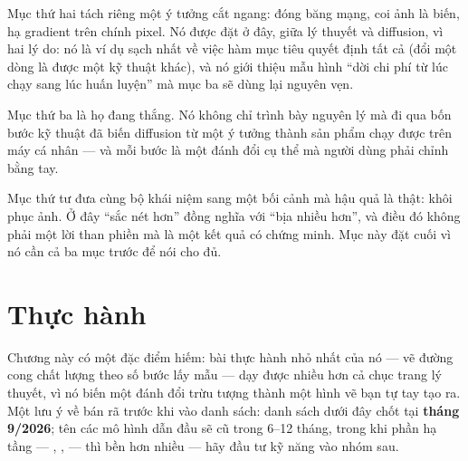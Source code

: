 \documentclass[../../deep_learning.tex]{subfiles}
\begin{document}
Mục thứ hai tách riêng một ý tưởng cắt ngang: đóng băng mạng, coi ảnh là biến, hạ gradient trên chính pixel. Nó được đặt ở đây, giữa lý thuyết và diffusion, vì hai lý do: nó là ví dụ sạch nhất về việc hàm mục tiêu quyết định tất cả (đổi một dòng là được một kỹ thuật khác), và nó giới thiệu mẫu hình ``dời chi phí từ lúc chạy sang lúc huấn luyện'' mà mục ba sẽ dùng lại nguyên vẹn.

Mục thứ ba là họ đang thắng. Nó không chỉ trình bày nguyên lý mà đi qua bốn bước kỹ thuật đã biến diffusion từ một ý tưởng thành sản phẩm chạy được trên máy cá nhân --- và mỗi bước là một đánh đổi cụ thể mà người dùng phải chỉnh bằng tay.

Mục thứ tư đưa cùng bộ khái niệm sang một bối cảnh mà hậu quả là thật: khôi phục ảnh. Ở đây ``sắc nét hơn'' đồng nghĩa với ``bịa nhiều hơn'', và điều đó không phải một lời than phiền mà là một kết quả có chứng minh. Mục này đặt cuối vì nó cần cả ba mục trước để nói cho đủ.







\section{Thực hành}
Chương này có một đặc điểm hiếm: bài thực hành nhỏ nhất của nó --- vẽ đường cong chất lượng theo số bước lấy mẫu --- dạy được nhiều hơn cả chục trang lý thuyết, vì nó biến một đánh đổi trừu tượng thành một hình vẽ bạn tự tay tạo ra. Một lưu ý về bán rã trước khi vào danh sách: danh sách dưới đây chốt tại \textbf{tháng 9/2026}; tên các mô hình dẫn đầu sẽ cũ trong 6--12 tháng, trong khi phần hạ tầng --- , ,  --- thì bền hơn nhiều --- hãy đầu tư kỹ năng vào nhóm sau.
\end{document}
